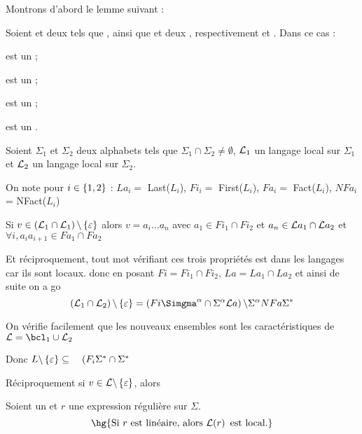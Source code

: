 \documentclass[a4paper,french,bookmarks]{book}
\begin{document}
    Montrons d'abord le lemme suivant :
    \begin{lemma}{}{}
        Soient  et  deux  tels que \hg{$\Sigma_1 \cap \Sigma_2 \neq \emptyset$}, ainsi que  et  deux , respectivement  et . Dans ce cas :
        \begin{enumerate}
            \itast {} est un  ;

            \itast {} est un  ;
            
            \itast {} est un  ;
            
            \itast {} est un .
        \end{enumerate}
    \end{lemma}
    
    \begin{nproof}
        Soient $\Sigma_1$ et $\Sigma_2$ deux alphabets tels que $\Sigma_1 \cap \Sigma_2 \neq \emptyset$, $\mathcal{L}_1$ un langage local sur $\Sigma_1$ et $\mathcal{L}_2$ un langage local sur $\Sigma_2$.
        
        On note pour \(i\in \left\{1, 2\right\}\) : \(La_i =\) Last(\(L_i\)), \(Fi_i =\) First(\(L_i\)), \(Fa_i =\) Fact(\(L_i\)), \(NFa_i\) = NFact(\(L_i\))

        \begin{psse}
            \item Si \(v \in \left(\mathcal{L}_1\cap\mathcal{L}_1\right)\backslash\left\{\varepsilon\right\}\) alors \(v = a_i \hdots a_n\) avec \(a_1 \in Fi_1 \cap Fi_2\) et \(a_n \in \mathcal{L} a_1 \cap \mathcal{L} a_2\) et \(\forall i, a_i a_{i+1} \in Fa_1 \cap Fa_2\)

            Et réciproquement, tout mot vérifiant ces trois propriétés est dans les langages car ils sont locaux. donc en posant \(Fi = Fi_1 \cap Fi_2\), \(La = La_1 \cap La_2\) et ainsi de suite on a go 
            \[ \left(\bcL_1\cap \bcL_2 \right) \backslash \ens{\varepsilon} = \left(Fi\Simgma^{\alpha} \cap \Sigma^{\alpha} \bcL a\right) \backslash \Sigma^{\alpha} NFa \Sigma^*\]

            On vérifie facilement que les nouveaux ensembles sont les caractéristiques de \(\bcL=\bcl_1\cup\bcL_2\)
            
            Donc $L \backslash \left\{\varepsilon\right\} \subseteq \quad (F_i \Sigma^* \cap \Sigma^* $

            \item Réciproquement  si \(v\in \mathcal{L}\backslash\left\{\varepsilon\right\}\), alors

            
        \end{psse}
    \end{nproof}
    
    
    \begin{property}{}{}
        Soient \hg{$\Sigma$} un  et $r$ une expression régulière sur $\Sigma$.
        \[ \hg{\text{Si} \ r \ \text{est linéaire, alors} \ \bcL\p{r} \ \text{est local.}} \]
    \end{property}
    
    
\end{document}
